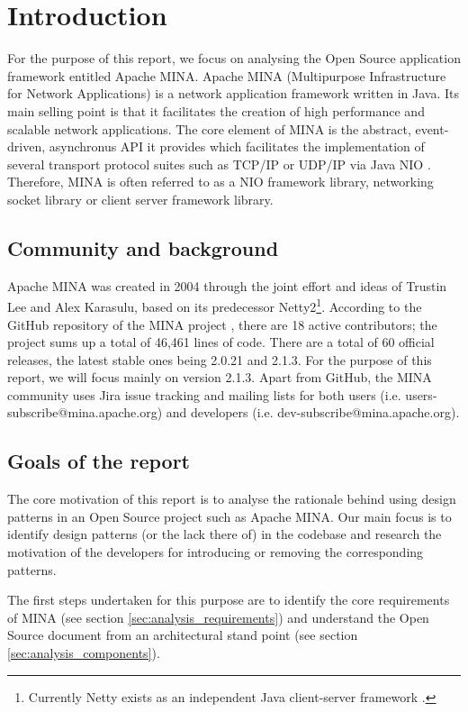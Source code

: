\section{Introduction}
\label{sec:introduction}

For the purpose of this report, we focus on analysing the Open Source application framework entitled Apache MINA. Apache MINA (Multipurpose Infrastructure for Network Applications) \cite{mina-website} is a network application framework written in Java. Its main selling point is that it facilitates the creation of high performance and scalable network applications. The core element of MINA is the abstract, event-driven, asynchronus API it provides which facilitates the implementation of several transport protocol suites such as TCP/IP or UDP/IP via Java NIO \cite{oracle-nio}. Therefore, MINA is often referred to as a NIO framework library, networking socket library or client server framework library.

\subsection{Community and background}
Apache MINA was created in 2004 through the joint effort and ideas of Trustin Lee and Alex Karasulu, based on its predecessor Netty2\footnote{Currently Netty exists as an independent Java client-server framework \cite{netty}.}. According to the GitHub repository of the MINA project \cite{mina-github}, there are 18 active contributors; the project sums up a total of 46,461 lines of code. There are a total of 60 official releases, the latest stable ones being 2.0.21 and 2.1.3. For the purpose of this report, we will focus mainly on version 2.1.3. Apart from GitHub, the MINA community uses Jira issue tracking \cite{mina-jira} and mailing lists for both users (i.e. users-subscribe@mina.apache.org) and developers (i.e. dev-subscribe@mina.apache.org). 

\subsection{Goals of the report}
The core motivation of this report is to analyse the rationale behind using design patterns in an Open Source project such as Apache MINA. Our main focus is to identify design patterns (or the lack there of) in the codebase and research the motivation of the developers for introducing or removing the corresponding patterns.

The first steps undertaken for this purpose are to identify the core requirements of MINA (see section \ref{sec:analysis_requirements}) and understand the Open Source document from an architectural stand point (see section \ref{sec:analysis_components}).
